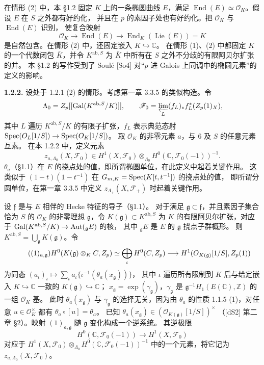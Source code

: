 在情形 (2) 中，本 §1.2 固定 $K$ 上的一条椭圆曲线 $E$，满足
$\operatorname{End}(E)\simeq\mathcal O_K$。假设 $E$ 在 $S$ 之外都有好约化，
并且在 $p$ 的素因子处也有好约化。把 $\mathcal O_K$ 与 $\operatorname{End}(E)$ 识别，
使复合映射
\[
\mathcal O_K\longrightarrow\operatorname{End}(E)\longrightarrow
\operatorname{End}_K(\operatorname{Lie}(E))=K
\]
是自然包含。在情形 (2) 中，还固定嵌入 $K\hookrightarrow\mathbb C$。
在情形 (1)、(2) 中都固定 $K$ 的一个代数闭包 $\bar K$，并令 $K^{\mathrm{ab},S}$ 为
$\bar K$ 中所有在 $S$ 之外不分歧的有限阿贝尔扩张的并。
本 §1.2 的写作受到了 Soulé [So4] 对“$p$ 进 Galois 上同调中的椭圆元素”的定义的影响。

\noindent\textbf{1.2.2.} 设处于 1.2.1 (2) 的情形。考虑第一章 3.3.5 的类似构造。令
\[
\Lambda_0=Z_p[[\operatorname{Gal}(K^{\mathrm{ab},S}/K)]],\qquad
\mathscr F_0=\varprojlim_L(f_L)_*f_L^*(Z_p(1)_X),
\]
其中 $L$ 遍历 $K^{\mathrm{ab},S}/K$ 的有限子扩张，$f_L$ 表示典范态射
$\operatorname{Spec}(O_L[1/S])\to\operatorname{Spec}(O_K[1/S])$。
取 $\mathcal O_K$ 的非零元素 $a$，与 $6$ 及 $S$ 的任意元素互素。
在本 1.2.2 中，定义元素
\[
z_{a,\Lambda_0}(X,\mathscr F_0)\in H^1(X,\mathscr F_0)
\otimes_{\Lambda_0}H^0(\mathbb C,\mathscr F_0(-1))^{-1}.
\]
$\theta_a$（§1.1）在 $E$ 的挠点处的值，即所谓椭圆单位，在此定义中起着关键作用。
这类似于 $(1-t)(1-t^{-1})$ 在 $G_{m,K}=\operatorname{Spec}(K[t,t^{-1}])$ 的挠点处的值，
即所谓分圆单位，在第一章 3.3.5 中定义 $z_{\Lambda_+}(X,\mathscr F_+)$ 时起着关键作用。

设 $\mathfrak f$ 是与 $E$ 相伴的 Hecke 特征的导子（§1.1）。
对于满足 $\mathfrak g\subset\mathfrak f$，并且素因子集合恰为 $S$ 的
$\mathcal O_K$ 的非零理想 $\mathfrak g$，令 $K(\mathfrak g)\subset K^{\mathrm{ab},S}$ 为
$K$ 的有限阿贝尔扩张，对应于
$\operatorname{Gal}(K^{\mathrm{ab},S}/K)\to\operatorname{Aut}({}_{\mathfrak g}E)$ 的核，
其中 ${}_{\mathfrak g}E$ 是 $E$ 的 $\mathfrak g$ 挠点子群概形。
则 $K^{\mathrm{ab},S}=\bigcup_{\mathfrak g}K(\mathfrak g)$。令
\begin{equation*}\tag{$(1)_{a,\mathfrak g}$}
H^0(K(\mathfrak g)\otimes_K\mathbb C,\mathbb Z_p)
\simeq\bigoplus_\iota H^0(\mathbb C,\mathbb Z_p)
\longrightarrow H^1(\mathcal O_{K(\mathfrak g)}[1/S],\mathbb Z_p(1))
\end{equation*}
为同态 $(a_\iota)_\iota\mapsto\sum_\iota a_\iota\{\iota^{-1}(\theta_a(x_{\mathfrak g}))\}$，
其中 $\iota$ 遍历所有限制到 $K$ 后与给定嵌入 $K\hookrightarrow\mathbb C$ 一致的
$K(\mathfrak g)\hookrightarrow\mathbb C$；
$x_{\mathfrak g}=\exp(\gamma_{\mathfrak g})$，$\gamma_{\mathfrak g}$ 是
$\mathfrak g^{-1}H_1(E(\mathbb C),\mathbb Z)$ 的一组 $\mathcal O_K$ 基。
此时 $\theta_a(x_{\mathfrak g})$ 与 $\gamma_{\mathfrak g}$ 的选择无关，因为由 $\theta_a$ 的性质
1.1.5 (1)，对任意 $u\in\mathcal O_K^\times$ 都有 $\theta_a\circ[u]=\theta_a$。
已知 $\theta_a(x_{\mathfrak g})\in(\mathcal O_{K(\mathfrak g)}[1/S])^\times$
（[dS2] 第二章 §2）。映射 $(1)_{a,\mathfrak g}$ 随 $\mathfrak g$ 变化构成一个逆系统。
其逆极限
\[
H^0(\mathbb C,\mathscr F_0(-1))\longrightarrow H^1(X,\mathscr F_0)
\]
对应于 $H^1(X,\mathscr F_0)\otimes_{\Lambda_0}H^0(\mathbb C,\mathscr F_0(-1))^{-1}$
中的一个元素，将它记为 $z_{a,\Lambda_0}(X,\mathscr F_0)$。


